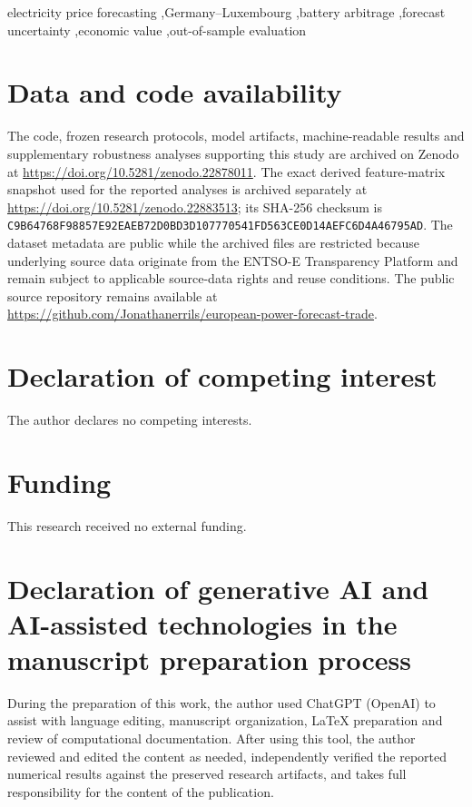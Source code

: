 \documentclass[preprint,12pt,authoryear]{elsarticle}
\begin{document}
\begin{frontmatter}
\begin{keyword}
electricity price forecasting \sep Germany--Luxembourg \sep battery arbitrage \sep forecast uncertainty \sep economic value \sep out-of-sample evaluation
\end{keyword}

\end{frontmatter}










\section*{Data and code availability}
The code, frozen research protocols, model artifacts, machine-readable results and supplementary robustness analyses supporting this study are archived on Zenodo at \url{https://doi.org/10.5281/zenodo.22878011}. The exact derived feature-matrix snapshot used for the reported analyses is archived separately at \url{https://doi.org/10.5281/zenodo.22883513}; its SHA-256 checksum is \nolinkurl{C9B64768F98857E92EAEB72D0BD3D107770541FD563CE0D14AEFC6D4A46795AD}. The dataset metadata are public while the archived files are restricted because underlying source data originate from the ENTSO-E Transparency Platform and remain subject to applicable source-data rights and reuse conditions. The public source repository remains available at \url{https://github.com/Jonathanerrils/european-power-forecast-trade}.

\section*{Declaration of competing interest}
The author declares no competing interests.

\section*{Funding}
This research received no external funding.

\section*{Declaration of generative AI and AI-assisted technologies in the manuscript preparation process}
During the preparation of this work, the author used ChatGPT (OpenAI) to assist with language editing, manuscript organization, LaTeX preparation and review of computational documentation. After using this tool, the author reviewed and edited the content as needed, independently verified the reported numerical results against the preserved research artifacts, and takes full responsibility for the content of the publication.
\end{document}
